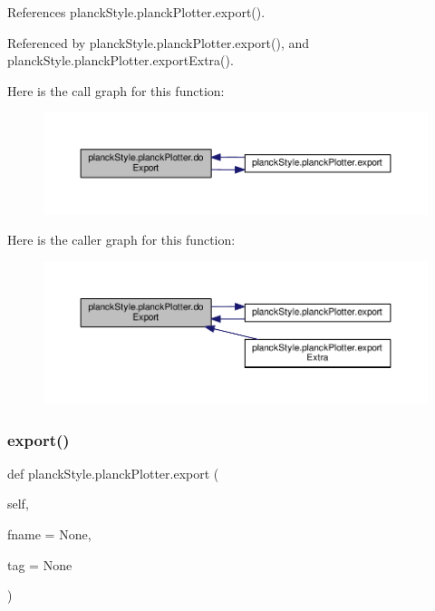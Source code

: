 References planck\+Style.\+planck\+Plotter.\+export().



Referenced by planck\+Style.\+planck\+Plotter.\+export(), and planck\+Style.\+planck\+Plotter.\+export\+Extra().

Here is the call graph for this function\+:
\nopagebreak
\begin{figure}[H]
\begin{center}
\leavevmode
\includegraphics[width=350pt]{classplanckStyle_1_1planckPlotter_addb6a7ed876802d0523c21dd66aa0138_cgraph}
\end{center}
\end{figure}
Here is the caller graph for this function\+:
\nopagebreak
\begin{figure}[H]
\begin{center}
\leavevmode
\includegraphics[width=350pt]{classplanckStyle_1_1planckPlotter_addb6a7ed876802d0523c21dd66aa0138_icgraph}
\end{center}
\end{figure}
\mbox{\label{classplanckStyle_1_1planckPlotter_a0100970f877b5a5267dc1e3dcde09111}} 
\subsubsection{\texorpdfstring{export()}{export()}}
{\footnotesize\ttfamily def planck\+Style.\+planck\+Plotter.\+export (\begin{DoxyParamCaption}\item[{}]{self,  }\item[{}]{fname = {\ttfamily None},  }\item[{}]{tag = {\ttfamily None} }\end{DoxyParamCaption})}



